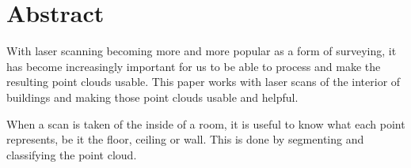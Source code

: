 

\section*{Abstract}

	With laser scanning becoming more and more popular as a form of surveying, it has become increasingly important for us to be able to process and make the resulting point clouds usable. This paper works with laser scans of the interior of buildings and making those point clouds usable and helpful.
	
	When a scan is taken of the inside of a room, it is useful to know what each point represents, be it the floor, ceiling or wall. This is done by segmenting and classifying the point cloud.
	
	
	
